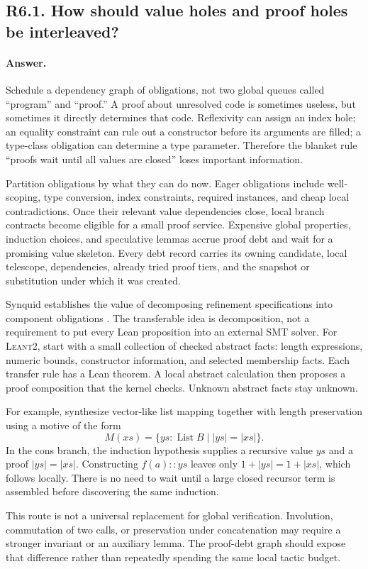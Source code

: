 \documentclass[11pt,a4paper]{article}
\newcommand{\repo}{\textsc{Leant2}}
\newcommand{\answer}{\paragraph{Answer.}}
\theoremstyle{definition}
\theoremstyle{remark}
\begin{document}
\subsection{R6.1. How should value holes and proof holes be interleaved?}
\answer Schedule a dependency graph of obligations, not two global queues called
``program'' and ``proof.'' A proof about unresolved code is sometimes useless,
but sometimes it directly determines that code. Reflexivity can assign an index
hole; an equality constraint can rule out a constructor before its arguments
are filled; a type-class obligation can determine a type parameter. Therefore
the blanket rule ``proofs wait until all values are closed'' loses important
information.

Partition obligations by what they can do now. Eager obligations include
well-scoping, type conversion, index constraints, required instances, and cheap
local contradictions. Once their relevant value dependencies close, local
branch contracts become eligible for a small proof service. Expensive global
properties, induction choices, and speculative lemmas accrue proof debt and
wait for a promising value skeleton. Every debt record carries its owning
candidate, local telescope, dependencies, already tried proof tiers, and the
snapshot or substitution under which it was created.

Synquid establishes the value of decomposing refinement specifications into
component obligations \cite{synquid}. The transferable idea is decomposition,
not a requirement to put every Lean proposition into an external SMT solver.
For \repo{}, start with a small collection of checked abstract facts: length
expressions, numeric bounds, constructor information, and selected membership
facts. Each transfer rule has a Lean theorem. A local abstract calculation then
proposes a proof composition that the kernel checks. Unknown abstract facts
stay unknown.

For example, synthesize vector-like list mapping together with length
preservation using a motive of the form
\[
 M(xs)=\{ys:\operatorname{List}B\mid |ys|=|xs|\}.
\]
In the cons branch, the induction hypothesis supplies a recursive value $ys$
and a proof $|ys|=|xs|$. Constructing $f(a)::ys$ leaves only
$1+|ys|=1+|xs|$, which follows locally. There is no need to wait until a large
closed recursor term is assembled before discovering the same induction.

This route is not a universal replacement for global verification. Involution,
commutation of two calls, or preservation under concatenation may require a
stronger invariant or an auxiliary lemma. The proof-debt graph should expose
that difference rather than repeatedly spending the same local tactic budget.
\end{document}
